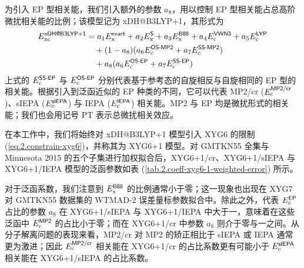 为引入 EP 型相关能，我们引入额外的参数 $a_8$，用以控制 EP 型相关能占总高阶微扰相关能的比例；该模型记为 xDH@B3LYP+1，其形式为
\begin{align}
  E_\mathrm{xc}^{\textsf{xDH@B3LYP+1}} &= a_1 E_\mathrm{x}^{\textsf{exact}} + a_2 E_\mathrm{x}^{\textsf{S}} + a_3 E_\mathrm{x}^{\textsf{B88}} + a_4 E_\mathrm{c}^{\textsf{VWN3}} + a_5 E_\mathrm{c}^{\textsf{LYP}} \notag \\
  &\quad + (1 - a_8) (a_6 E_\mathrm{c}^{\textsf{OS-MP2}} + a_7 E_\mathrm{c}^{\textsf{SS-MP2}}) \notag\\
  &\quad + a_8 (a_6 E_\mathrm{c}^{\textsf{OS-EP}} + a_7 E_\mathrm{c}^{\textsf{SS-EP}})
\end{align}
上式的 $E_\mathrm{c}^{\textsf{SS-EP}}$ 与 $E_\mathrm{c}^{\textsf{OS-EP}}$ 分别代表基于参考态的自旋相反与自旋相同的 EP 型的相关能。根据引入到泛函近似的 EP 种类的不同，它可以代表 MP2/cr ($E_\mathrm{c}^{\textsf{MP2/cr}}$)、sIEPA ($E_\mathrm{c}^{\textsf{sIEPA}}$) 与 IEPA ($E_\mathrm{c}^{\textsf{IEPA}}$) 相关能。MP2 与 EP 均是微扰形式的相关能；我们也会用记号 PT 表示总微扰相关效应。

在本工作中，我们将始终对 xDH@B3LYP+1 模型引入 XYG6 的限制 (\ref{eq.2.constrain-xyg6})，并称其为 XYG6+1 模型。对 GMTKN55 全集与 Minnesota 2015 的五个子集进行加权拟合后，XYG6+1/cr、XYG6+1/sIEPA 与 XYG6+1/IEPA 模型的泛函参数如表 (\ref{tab.2.coeff-xyg6-1-weighted-error}) 所示。

对于泛函系数，我们注意到 $E_\mathrm{x}^{\textsf{B88}}$ 的比例通常小于零；这一现象也出现在 XYG7 对 GMTKN55 数据集的 WTMAD-2 误差量标参数拟合中。除此之外，代表 $E_\mathrm{c}^{\textsf{EP}}$ 占比的参数 $a_8$ 在 XYG6+1/sIEPA 与 XYG6+1/IEPA 中大于一，意味着在这些泛函中 $E_\mathrm{c}^{\textsf{MP2}}$ 的占比小于零；而在 XYG6+1/cr 中参数 $a_8$ 则介于零与一之间。从分子解离问题的表现来看，MP2/cr 对 MP2 的矫正相比于 sIEPA 或 IEPA 通常更为激进；因此 $E_\mathrm{c}^{\textsf{MP2/cr}}$ 相关能在 XYG6+1/cr 的占比系数更有可能小于 $E_\mathrm{c}^{\textsf{sIEPA}}$ 相关能在 XYG6+1/sIEPA 的占比系数。

